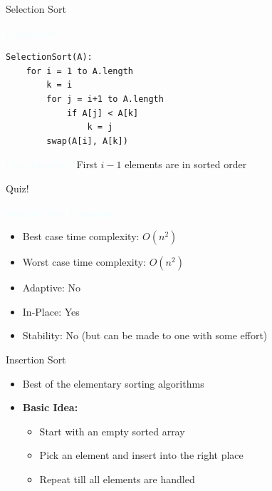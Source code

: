 \documentclass{beamer}
\newcommand{\tblue}[1]{{\Large {\textcolor{azure}{#1}}}}
\begin{document}
\begin{frame}[fragile]{Selection Sort}

\tblue{Pseudocode:}
\begin{verbatim}
SelectionSort(A):
    for i = 1 to A.length 
        k = i
        for j = i+1 to A.length 
            if A[j] < A[k]
                k = j
        swap(A[i], A[k])
\end{verbatim}

\tblue{Loop Invariant:} First $i-1$ elements are in sorted order
\end{frame}



\begin{frame}{Quiz!}

\tblue{Selection Sort Properties:}

\begin{itemize}
\item Best case time complexity:  $O(n^2)$
\item Worst case time complexity: $O(n^2)$
\item Adaptive: No 
\item In-Place: Yes
\item Stability: No (but can be made to one with some effort) 
\end{itemize}
\end{frame}




\begin{frame}{Insertion Sort}
\begin{itemize}
\item Best of the elementary sorting algorithms 
\item {\bf Basic Idea:}
\begin{itemize}
    \item Start with an empty sorted array
    \item Pick an element and insert into the right place
    \item Repeat till all elements are handled
\end{itemize}
\end{itemize}
\end{frame}
\end{document}
